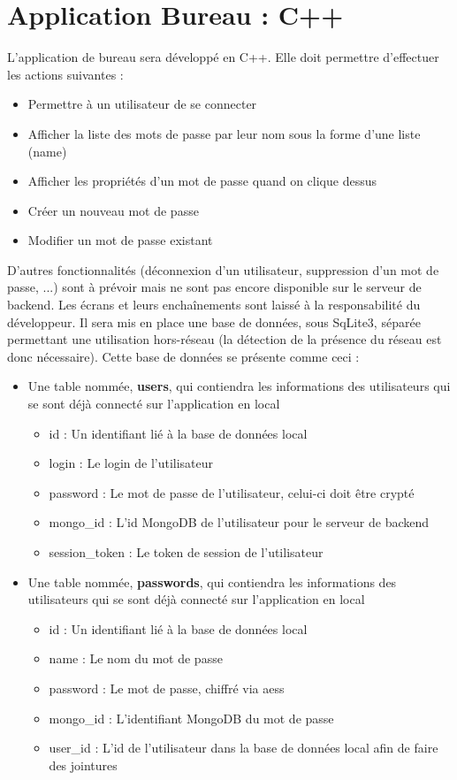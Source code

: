 \documentclass[12pt]{report}
\begin{document}
	\chapter{Application Bureau : C++}
	L'application de bureau sera développé en C++. Elle doit permettre d'effectuer les actions suivantes :
	\begin{itemize}
		\item Permettre à un utilisateur de se connecter
		\item Afficher la liste des mots de passe par leur nom sous la forme d'une liste (name)
		\item Afficher les propriétés d'un mot de passe quand on clique dessus
		\item Créer un nouveau mot de passe
		\item Modifier un mot de passe existant
	\end{itemize}
	D'autres fonctionnalités (déconnexion d'un utilisateur, suppression d'un mot de passe, ...) sont à prévoir mais ne sont pas encore disponible sur le serveur de backend.
	\newline
	Les écrans et leurs enchaînements sont laissé à la responsabilité du développeur.
	\newline
	Il sera mis en place une base de données, sous SqLite3, séparée permettant une utilisation hors-réseau (la détection de la présence du réseau est donc nécessaire).
	\newline
	Cette base de données se présente comme ceci :
	\begin{itemize}
		\item Une table nommée, \textbf{users}, qui contiendra les informations des utilisateurs qui se sont déjà connecté sur l'application en local
		\begin{itemize}
			\item id : Un identifiant lié à la base de données local
			\item login : Le login de l'utilisateur
			\item password : Le mot de passe de l'utilisateur, celui-ci doit être crypté
			\item mongo\_id : L'id MongoDB de l'utilisateur pour le serveur de backend
			\item session\_token : Le token de session de l'utilisateur
		\end{itemize}
		\item Une table nommée, \textbf{passwords}, qui contiendra les informations des utilisateurs qui se sont déjà connecté sur l'application en local
		\begin{itemize}
			\item id : Un identifiant lié à la base de données local
			\item name : Le nom du mot de passe
			\item password : Le mot de passe, chiffré via \glspl{aes}
			\item mongo\_id : L'identifiant MongoDB du mot de passe
			\item user\_id : L'id de l'utilisateur dans la base de données local afin de faire des jointures
		\end{itemize}
	\end{itemize}
\end{document}
